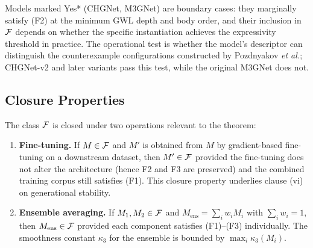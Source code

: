 Models marked Yes* (CHGNet, M3GNet) are boundary cases: they marginally satisfy (F2) at the minimum GWL depth and body order, and their inclusion in $\mathcal{F}$ depends on whether the specific instantiation achieves the expressivity threshold in practice. The operational test is whether the model's descriptor can distinguish the counterexample configurations constructed by Pozdnyakov \emph{et al.}\cite{pozdnyakov2020incompleteness}; CHGNet-v2 and later variants pass this test, while the original M3GNet does not.

\subsection{Closure Properties}

The class $\mathcal{F}$ is closed under two operations relevant to the theorem:
\begin{enumerate}
    \item \textbf{Fine-tuning.} If $M \in \mathcal{F}$ and $M'$ is obtained from $M$ by gradient-based fine-tuning on a downstream dataset, then $M' \in \mathcal{F}$ provided the fine-tuning does not alter the architecture (hence F2 and F3 are preserved) and the combined training corpus still satisfies (F1). This closure property underlies clause (vi) on generational stability.
    \item \textbf{Ensemble averaging.} If $M_1, M_2 \in \mathcal{F}$ and $M_{\text{ens}} = \sum_i w_i M_i$ with $\sum_i w_i = 1$, then $M_{\text{ens}} \in \mathcal{F}$ provided each component satisfies (F1)--(F3) individually. The smoothness constant $\kappa_3$ for the ensemble is bounded by $\max_i \kappa_3(M_i)$.
\end{enumerate}
